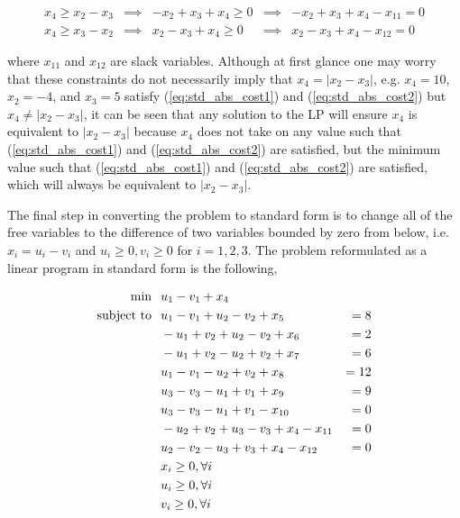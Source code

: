 \documentclass{article}
\begin{document}
\begin{align} \label{eq:std_abs_cost1}
x_4 \ge x_2 - x_3 & \implies & -x_2 + x_3 + x_4 \ge 0 & \implies & -x_2 + x_3 + x_4 - x_{11} = 0\\ \label{eq:std_abs_cost2}
x_4 \ge x_3 - x_2 & \implies & x_2 - x_3 + x_4 \ge 0 & \implies & x_2 - x_3 + x_4 - x_{12} = 0
\end{align}

\noindent where $x_{11}$ and $x_{12}$ are slack variables. 
Although at first glance one may worry that these constraints do not necessarily imply that $x_4 = |x_2 - x_3|$, e.g. $x_4 = 10$, $x_2 = -4$, and $x_3 = 5$ satisfy (\ref{eq:std_abs_cost1}) and (\ref{eq:std_abs_cost2}) but $x_4 \ne |x_2 - x_3|$, it can be seen that any solution to the LP will ensure $x_4$ is equivalent to $|x_2 - x_3|$ because $x_4$ does not take on any value such that (\ref{eq:std_abs_cost1}) and (\ref{eq:std_abs_cost2}) are satisfied, but the minimum value such that (\ref{eq:std_abs_cost1}) and (\ref{eq:std_abs_cost2}) are satisfied, which will always be equivalent to $|x_2 - x_3|$.

The final step in converting the problem to standard form is to change all of the free variables to the difference of two variables bounded by zero from below, i.e. $x_i = u_i - v_i$ and $u_i \ge 0, v_i \ge 0$ for $i = 1, 2, 3$. The problem reformulated as a linear program in standard form is the following,

\begin{eqnarray*}
\text{min} & \hspace{0.1in} u_1 - v_1 + x_4&\\
\text{subject to} & \hspace{0.1in} u_1 - v_1 + u_2 - v_2 + x_5 &= 8\\
&\hspace{0.1in} -u_1 + v_2 + u_2 - v_2 + x_6 &= 2\\
&\hspace{0.1in} -u_1 + v_2 - u_2 + v_2 + x_7 &= 6\\
&\hspace{0.1in} u_1 - v_1 - u_2 + v_2 + x_8 &= 12\\
&\hspace{0.1in} u_3 - v_3 - u_1 + v_1 + x_9 &= 9\\
&\hspace{0.1in} u_3 - v_3 - u_1 + v_1 - x_{10} &= 0\\
&\hspace{0.1in} -u_2 + v_2 + u_3 - v_3 + x_4 - x_{11} &= 0\\
&\hspace{0.1in} u_2 - v_2 - u_3 + v_3 + x_4 - x_{12} &= 0\\
&\hspace{0.1in} x_i \ge 0, \forall i&\\
&\hspace{0.1in} u_i \ge 0, \forall i&\\
&\hspace{0.1in} v_i \ge 0, \forall i&
\end{eqnarray*}
\end{document}
